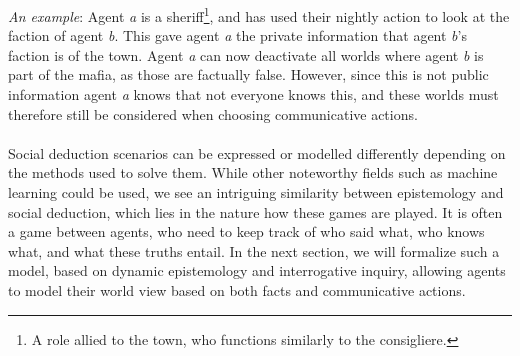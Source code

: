 \textit{An example}: Agent \textit{a} is a sheriff\footnote{A role allied to the town, who functions
	similarly to the consigliere.}, and has used their nightly action to look at the
faction of agent \textit{b}. This gave agent \textit{a} the private information that agent \textit{b}'s
faction is of the town. Agent \textit{a} can now deactivate all worlds where agent \textit{b} is
part of the mafia, as those are factually false. However, since this is not
public information agent \textit{a} knows that not everyone knows this, and these
worlds must therefore still be considered when choosing communicative actions. \\\\ Social deduction
scenarios can be expressed or modelled differently depending on the methods
used to solve them. While other noteworthy fields such as machine learning
could be used, we see an intriguing similarity between epistemology and social
deduction, which lies in the nature how these games are played. It is often a
game between agents, who need to keep track of who
said what, who knows what, and what these truths entail. In the next section,
we will formalize such a model, based on dynamic epistemology and interrogative
inquiry, allowing agents to model their world view based on both facts and
communicative actions.